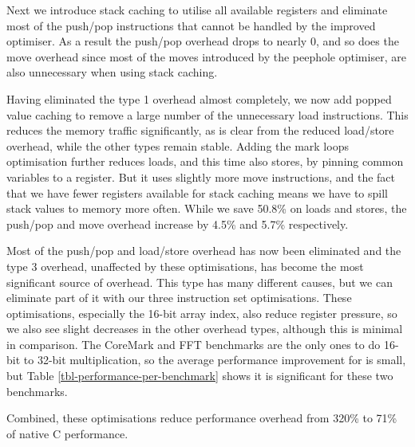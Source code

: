 Next we introduce stack caching to utilise all available registers and eliminate most of the push/pop instructions that cannot be handled by the improved optimiser. As a result the push/pop overhead drops to nearly 0, and so does the move overhead since most of the moves introduced by the peephole optimiser, are also unnecessary when using stack caching.

Having eliminated the type 1 overhead almost completely, we now add popped value caching to remove a large number of the unnecessary load instructions. This reduces the memory traffic significantly, as is clear from the reduced load/store overhead, while the other types remain stable. Adding the mark loops optimisation further reduces loads, and this time also stores, by pinning common variables to a register. But it uses slightly more move instructions, and the fact that we have fewer registers available for stack caching means we have to spill stack values to memory more often. While we save 50.8\% on loads and stores, the push/pop and move overhead increase by 4.5\% and 5.7\% respectively.

Most of the push/pop and load/store overhead has now been eliminated and the type 3 overhead, unaffected by these optimisations, has become the most significant source of overhead. This type has many different causes, but we can eliminate part of it with our three instruction set optimisations. These optimisations, especially the 16-bit array index, also reduce register pressure, so we also see slight decreases in the other overhead types, although this is minimal in comparison. The CoreMark and FFT benchmarks are the only ones to do 16-bit to 32-bit multiplication, so the average performance improvement for  is small, but Table \ref{tbl-performance-per-benchmark} shows it is significant for these two benchmarks.

Combined, these optimisations reduce performance overhead from 320\% to 71\% of native C performance.
